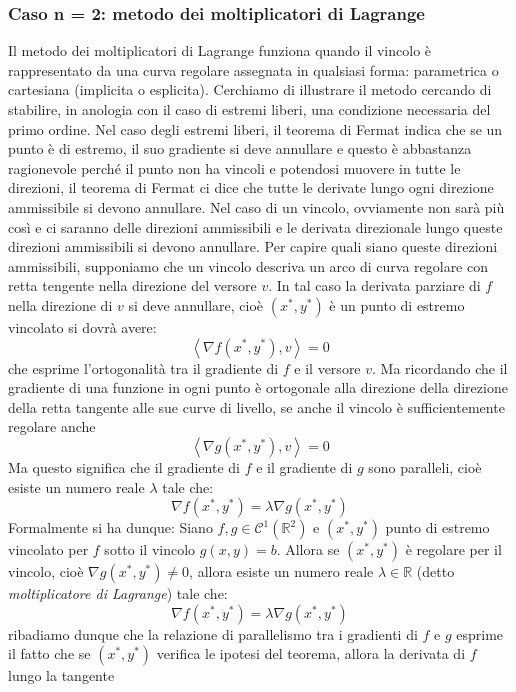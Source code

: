 \documentclass[a4paper]{article}
\numberwithin{equation}{subsection}
\begin{document}
\subsubsection{Caso n = 2: metodo dei moltiplicatori di Lagrange}
Il metodo dei moltiplicatori di Lagrange funziona quando il vincolo è rappresentato da una curva regolare assegnata
in qualsiasi forma: parametrica o cartesiana (implicita o esplicita). 
Cerchiamo di illustrare il metodo cercando di stabilire, in anologia con il caso di estremi liberi,
una condizione necessaria del primo ordine. Nel caso degli estremi liberi, il teorema di Fermat indica che
se un punto è di estremo, il suo gradiente si deve annullare e questo è abbastanza ragionevole 
perché il punto non ha vincoli e potendosi muovere in tutte le direzioni, il teorema di Fermat
ci dice che tutte le derivate lungo ogni direzione ammissibile si devono annullare. 
Nel caso di un vincolo, ovviamente non sarà più così e ci saranno delle direzioni ammissibili e le derivata
direzionale lungo queste direzioni ammissibili si devono annullare.
Per capire quali siano queste direzioni ammissibili, supponiamo che un vincolo descriva
un arco di curva regolare con retta tengente nella direzione del versore $v$. 
In tal caso la derivata parziare di $f$ nella direzione di $v$ si deve annullare, cioè $(x^\ast ,y^\ast)$ è un punto di estremo vincolato si dovrà avere:
\[\left< \nabla f(x^\ast,y^\ast), v \right> = 0\]
che esprime l'ortogonalità tra il gradiente di $f$ e il versore $v$. 
Ma ricordando che il gradiente di una funzione in ogni punto è ortogonale alla direzione della direzione della retta
tangente alle sue curve di livello, se anche il vincolo è sufficientemente regolare anche
\[\left< \nabla g(x^\ast,y^\ast), v \right> = 0\]
Ma questo significa che il gradiente di $f$ e il gradiente di $g$ sono paralleli, cioè esiste un numero reale $\lambda$ tale che:
\[\nabla f(x^\ast,y^\ast) = \lambda \nabla g(x^\ast,y^\ast)\]
Formalmente si ha dunque: 
{
Siano $f,g \in \mathcal{C}^1(\mathbb{R}^2)$ e $(x^\ast, y^\ast)$ punto di estremo vincolato 
per $f$ sotto il vincolo $g(x,y) = b$. Allora se $(x^\ast, y^\ast)$ è regolare
per il vincolo, cioè $\nabla g(x^\ast,y^\ast) \neq 0$, allora esiste un numero reale $\lambda \in \mathbb{R}$ 
(detto \textit{moltiplicatore di Lagrange}) tale che:
\[\nabla f(x^\ast,y^\ast) = \lambda \nabla g(x^\ast,y^\ast)\]
}
\noindent
ribadiamo dunque che la relazione di parallelismo tra i gradienti di $f$ e $g$ esprime
il fatto che se $(x^\ast, y^\ast)$ verifica le ipotesi del teorema, allora la derivata di $f$ lungo la tangente
\end{document}
